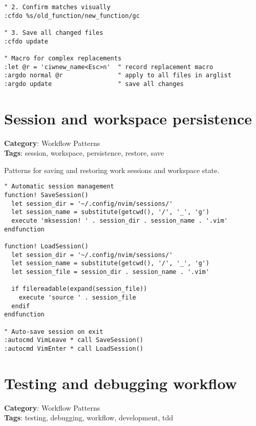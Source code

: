 {{{{{{{{{{{{{{{{{{{\begin{Exa*}{}
\begin{Verbatim}[fontsize=\footnotesize, breaklines, breakanywhere]
" 2. Confirm matches visually
:cfdo %s/old_function/new_function/gc

" 3. Save all changed files
:cfdo update

" Macro for complex replacements
:let @r = 'ciwnew_name<Esc>n'  " record replacement macro
:argdo normal @r               " apply to all files in arglist
:argdo update                  " save all changes
\end{Verbatim}
\end{Exa*}

\section{Session and workspace persistence}

\textbf{Category}: Workflow Patterns\\ \textbf{Tags}: session, workspace, persistence, restore, save
\vspace{0.5cm}

Patterns for saving and restoring work sessions and workspace state.

\begin{Exa*}{}
\begin{Verbatim}[fontsize=\footnotesize, breaklines, breakanywhere]
" Automatic session management
function! SaveSession()
  let session_dir = '~/.config/nvim/sessions/'
  let session_name = substitute(getcwd(), '/', '_', 'g')
  execute 'mksession! ' . session_dir . session_name . '.vim'
endfunction

function! LoadSession()
  let session_dir = '~/.config/nvim/sessions/'
  let session_name = substitute(getcwd(), '/', '_', 'g')
  let session_file = session_dir . session_name . '.vim'
  
  if filereadable(expand(session_file))
    execute 'source ' . session_file
  endif
endfunction

" Auto-save session on exit
:autocmd VimLeave * call SaveSession()
:autocmd VimEnter * call LoadSession()
\end{Verbatim}
\end{Exa*}

\section{Testing and debugging workflow}

\textbf{Category}: Workflow Patterns\\ \textbf{Tags}: testing, debugging, workflow, development, tdd
\vspace{0.5cm}

}}}}}}}}}}}}}}}}}}}
